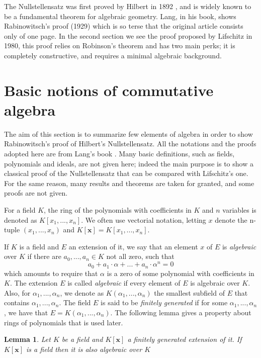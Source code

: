 \documentclass[a4paper,12pt,oneside]{book}
\newtheorem{lemma}[theorem]{Lemma}
\begin{document}
The Nullstellensatz was first proved by Hilbert \cite{Hilbert} in 1892 , and is widely known to be a fundamental theorem for algebraic geometry. Lang, in his book,  shows Rabinowitsch's proof (1929) which is so terse that the original article \cite{Rabin} consists only of one page. 
In the second section we see the proof proposed by Lifschitz \cite{lifschitz} in 1980, this proof relies on Robinson's theorem and has two main perks; it is completely constructive, and requires a minimal algebraic background. 




\section{Basic notions of commutative algebra}
The aim of this section is to summarize few elements of algebra in order to show  Rabinowitsch's proof of  Hilbert's Nullstellensatz. All the notations and the proofs adopted here are from Lang's book \cite{Lang}. Many basic definitions, such as fields, polynomials and ideals, are not given here; indeed the main purpose is to show a classical proof of the Nullstellensatz that can be compared with Lifschitz's one.
For the same reason, many results and theorems are taken for granted, and some proofs are not given.




For a field $K$, the ring of the polynomials with coefficients in $K$ and $n$ variables is denoted as $K[x_1,...,x_n ]$. We often use vectorial notation, letting  $x$ denote the n-tuple $(x_1,...,x_n)$ and $K[\mathbf{x}]= K[x_1,...,x_n ] $.


If $K$ is a field and $E$ an extension of it, we say that an element $x$ of $E$ is \textit{algebraic} over $K$ if there are $a_0, ..., a_n\in K$ not all zero, such that
$$ a_0 + a_1 \cdot \alpha + ...+ a_n \cdot \alpha^n=0 $$ 
which amounts to require that $\alpha$  is a zero of some polynomial with coefficients in $K$. The extension $E$ is called \textit{algebraic} if every element of $E$ is algebraic over $K$. 
Also, for $\alpha_1, ...,\alpha_n $, we denote as $K(\alpha_1, ...,\alpha_n) $ the smallest subfield of $E$ that contains $\alpha_1, ...,\alpha_n$. The field $E$ is said to be \textit{finitely generated} if for some $\alpha_1, ...,\alpha_n$, we have that $E=K(\alpha_1, ...,\alpha_n)$. 
The following lemma gives a property about rings of polynomials that is used later.
\begin{lemma}\label{finit_gen}
Let $K$ be a field and $K[\mathbf{x}]$ a finitely generated extension of it. If $K[\mathbf{x}]$ is a field then it is also algebraic over $K$
\end{lemma}
\end{document}
